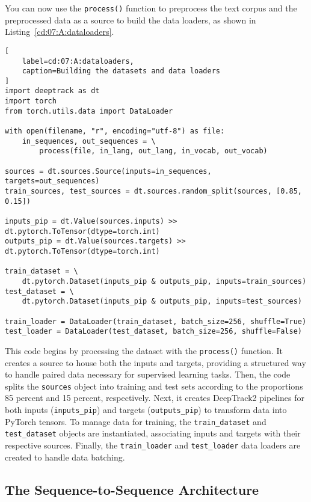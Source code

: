 You can now use the \lstinline{process()} function to preprocess the text corpus and the preprocessed data as a source to build the data loaders, as shown in Listing~\ref{cd:07:A:dataloaders}.
\begin{lstlisting}[
    label=cd:07:A:dataloaders,
    caption=Building the datasets and data loaders
]
import deeptrack as dt
import torch
from torch.utils.data import DataLoader

with open(filename, "r", encoding="utf-8") as file:
    in_sequences, out_sequences = \
        process(file, in_lang, out_lang, in_vocab, out_vocab)

sources = dt.sources.Source(inputs=in_sequences, targets=out_sequences)
train_sources, test_sources = dt.sources.random_split(sources, [0.85, 0.15])

inputs_pip = dt.Value(sources.inputs) >> dt.pytorch.ToTensor(dtype=torch.int)
outputs_pip = dt.Value(sources.targets) >> dt.pytorch.ToTensor(dtype=torch.int)

train_dataset = \
    dt.pytorch.Dataset(inputs_pip & outputs_pip, inputs=train_sources)
test_dataset = \
    dt.pytorch.Dataset(inputs_pip & outputs_pip, inputs=test_sources)

train_loader = DataLoader(train_dataset, batch_size=256, shuffle=True)
test_loader = DataLoader(test_dataset, batch_size=256, shuffle=False)
\end{lstlisting}
This code begins by processing the dataset with the \lstinline{process()} function. It creates a source to house both the inputs and targets, providing a structured way to handle paired data necessary for supervised learning tasks. Then, the code splits the \lstinline{sources} object into training and test sets according to the proportions 85 percent and 15 percent, respectively. Next, it creates DeepTrack2 pipelines for both inputs (\lstinline{inputs_pip}) and targets (\lstinline{outputs_pip}) to transform data into PyTorch tensors. To manage data for training, the \lstinline{train_dataset} and \lstinline{test_dataset} objects are instantiated, associating inputs and targets with their respective sources. Finally, the \lstinline{train_loader} and \lstinline{test_loader} data loaders are created to handle data batching.

\subsection{The Sequence-to-Sequence Architecture}

